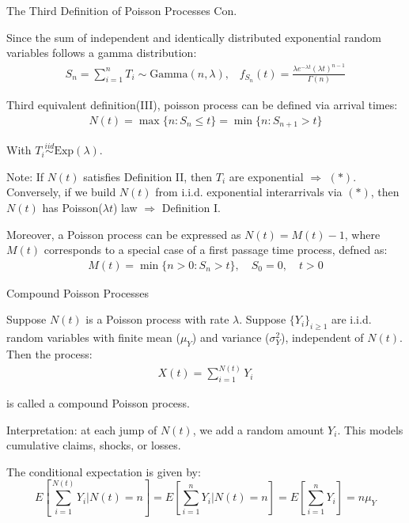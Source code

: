 \documentclass{beamer}
\begin{document}
\begin{frame}{The Third Definition of Poisson Processes Con.}

    {\footnotesize \footnotesize
   \par  Since the sum of independent and identically distributed exponential random variables follows a gamma distribution:
   \begin{align*}
    S_n = \sum_{i=1}^n T_i \sim \text{Gamma}(n, \lambda),\;\;\; f_{S_n}(t) = \frac{\lambda e^{-\lambda t} (\lambda t)^{n-1}}{\Gamma(n)}
   \end{align*}
    \par  Third equivalent definition(III), poisson process can be defined via arrival times:
    \begin{align*}
        N(t) = \max\{n : S_n \leq t\} = \min\{n : S_{n+1} > t\} \tag{*}
    \end{align*}
    \par With \( T_i \overset{iid}{\sim} \text{Exp}(\lambda) \).
    \vspace{1em}
    \par Note: If \( N(t) \) satisfies Definition II, then \( T_i \) are exponential \(\Rightarrow\) $(*)$. 
    Conversely, if we build \( N(t) \) from i.i.d. exponential interarrivals via $(*)$, 
    then \( N(t) \) has Poisson(\(\lambda t\)) law \(\Rightarrow\) Definition I.
     \vspace{1em}
    \par Moreover, a Poisson process can be expressed as \( N(t) = M(t) - 1 \), where $M(t)$ corresponds 
    to a special case of a first passage time process, defned as:
    \begin{align*}
        M(t) = \min\{n > 0 : S_n > t\}, \quad S_0 = 0, \quad t > 0
    \end{align*}

    }
    
\end{frame}

\begin{frame}{Compound Poisson Processes}

    {\footnotesize \footnotesize
    \par  Suppose \( N(t) \) is a Poisson process with rate \(\lambda\).
    Suppose \(\{Y_i\}_{i \geq 1}\) are i.i.d. random variables with finite mean ($\mu_Y$) and variance ($\sigma^2_Y$), independent of \(N(t)\). Then the process:
    \begin{align*}
        X(t) = \sum_{i=1}^{N(t)} Y_i
    \end{align*}
    \par  is called a compound Poisson process.
    \vspace{1em}
    \par Interpretation: at each jump of \(N(t)\), we add a random amount \(Y_i\). This models cumulative claims, shocks, or losses.
    \vspace{1em}
    \par The conditional expectation is given by:
        \[
        E \left[ \sum_{i=1}^{N(t)} Y_i | N(t) = n \right] = E \left[ \sum_{i=1}^n Y_i | N(t) = n \right] = E \left[ \sum_{i=1}^n Y_i \right] = n \mu_Y
        \]
    }
    
\end{frame}
\end{document}
